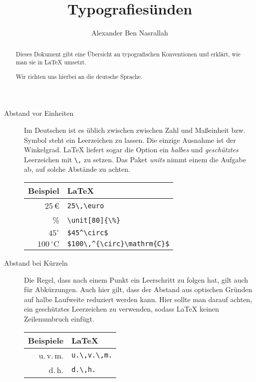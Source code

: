 \documentclass[a4paper]{article}
\title{Typografies\"unden}
\author{Alexander Ben Nasrallah}
\begin{document}
\maketitle
\begin{abstract}
	Dieses Dokument gibt eine \"Ubersicht an typografischen Konventionen und
	erkl\"art, wie man sie in \LaTeX{} umsetzt.

	Wir richten uns hierbei an die deutsche Sprache.
\end{abstract}

\begin{description}
	\item[Abstand vor Einheiten] Im Deutschen ist es \"ublich zwischen zwischen
		Zahl und Ma\ss{}einheit bzw. Symbol steht ein Leerzeichen zu lassen. Die
		einzige Ausnahme ist der Winkelgrad. \LaTeX{} liefert sogar die Option
		ein \emph{halbes} und \emph{gesch\"utztes} Leerzeichen mit \verb+\,+ zu
		setzen. Das Paket \emph{units} nimmt einem die Aufgabe ab, auf solche
		Abst\"ande zu achten.

		\begin{tabular}[c]{|rl|}
			\hline
			\bf{Beispiel}             & \bf{\LaTeX}                       \\
			\hline
			25\,\euro                 & \verb+25\,\euro+                  \\
			\unit[80]{\%}             & \verb+\unit[80]{\%}+              \\
			$45^\circ$                & \verb+$45^\circ$+                 \\
			$100\,^{\circ}\mathrm{C}$ & \verb+$100\,^{\circ}\mathrm{C}$+ \\
			\hline
		\end{tabular}
	\item[Abstand bei K\"urzeln] Die Regel, dass nach einem Punkt ein
		Leerschritt zu folgen hat, gilt auch für Abkürzungen. Auch hier gilt,
		dass der Abstand aus optischen Gründen auf halbe Laufweite reduziert
		werden kann. Hier sollte man darauf achten, ein gesch\"utztes
		Leerzeichen zu verwenden, sodass \LaTeX{} keinen Zeilenumbruch
		einf\"ugt.

		\begin{tabular}[c]{|rl|}
			\hline
			\bf{Beispiele} & \bf{\LaTeX}       \\
			\hline
			u.\,v.\,m.     & \verb+u.\,v.\,m.+ \\
			d.\,h.         & \verb+d.\,h.+     \\
			\hline
		\end{tabular}

\end{description}
\end{document}
